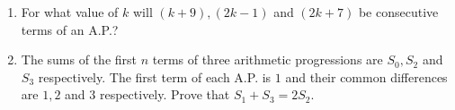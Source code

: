 \begin{enumerate}
								\item For what value of $k$ will $(k+9), (2k-1)$ and $( 2k+7)$ be consecutive terms of an A.P.?

\item The sums of the first $n$ terms of three arithmetic progressions are $S_0, S_2$ and $S_3$ respectively. The first term of each A.P. is $1$ and their common differences are $1, 2$ and $3$ respectively. Prove that $S_1 + S_3 = 2S_2$.
								\end{enumerate}
